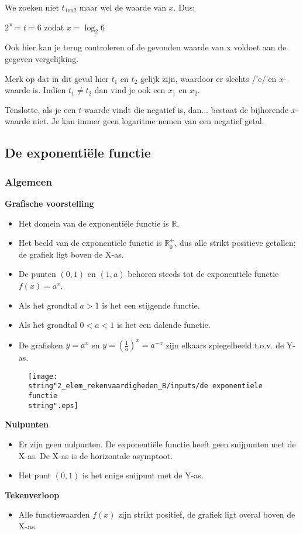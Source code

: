 We zoeken niet ${\displaystyle t_{1\textrm{en}2}}$ maar wel de waarde
van $x$. Dus:

${\displaystyle 2^{x}=t=6}$ zodat ${\displaystyle x=\log_{2}6}$

Ook hier kan je terug controleren of de gevonden waarde van x voldoet
aan de gegeven vergelijking. 

Merk op dat in dit geval hier ${\displaystyle t_{1}}$ en ${\displaystyle t_{2}}$
gelijk zijn, waardoor er slechts /'e/'en $x$-waarde is. Indien ${\displaystyle t_{1}\neq{\displaystyle t_{2}}}$
dan vind je ook een ${\displaystyle x_{1}}$ en ${\displaystyle x_{2}}$.

Tenslotte, als je een $t$-waarde vindt die negatief is, dan... bestaat
de bijhorende $x$-waarde niet. Je kan immer geen logaritme nemen
van een negatief getal.


\subsection{De exponenti\"ele functie}


\subsubsection{Algemeen}

\noindent \textbf{Grafische voorstelling}
\begin{itemize}
\item Het domein van de exponenti\"ele functie is $\mathbb{R}$.
\item Het beeld van de exponenti\"ele functie is ${\displaystyle \mathbb{R}}_{0}^{+}$,
dus alle strikt positieve getallen; de grafiek ligt boven de X-as.
\item De punten $(0,1)$ en $(1,a)$ behoren steeds tot de exponenti\"ele
functie ${\displaystyle f(x)=a^{x}}$.
\item Als het grondtal $a>1$ is het een stijgende functie.
\item Als het grondtal $0<a<1$ is het een dalende functie.
\item De grafieken ${\displaystyle y=a^{x}}$ en ${\displaystyle y=\left(\frac{1}{a}\right)^{x}=a^{-x}}$
zijn elkaars spiegelbeeld t.o.v. de Y-as.
\end{itemize}
\begin{figure}
\centering
\texttt{[image: \\string"2\_elem\_rekenvaardigheden\_B/inputs/de exponentiele functie\\string".eps]}
\end{figure}


\noindent \textbf{Nulpunten}
\begin{itemize}
\item Er zijn geen nulpunten. De exponenti\"ele functie heeft geen snijpunten
met de X-as. De X-as is de horizontale asymptoot.
\item Het punt $(0,1)$ is het enige snijpunt met de Y-as.
\end{itemize}
\noindent \textbf{Tekenverloop}
\begin{itemize}
\item Alle functiewaarden $f(x)$ zijn strikt positief, de grafiek ligt
overal boven de X-as.
\end{itemize}

